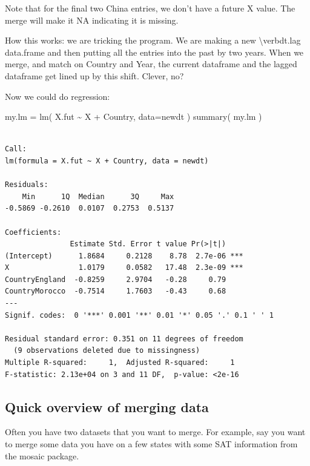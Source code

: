 \documentclass[
  letterpaper,
  DIV=11,
  numbers=noendperiod]{scrreprt}
\newenvironment{Shaded}{}{}
\newcommand{\AttributeTok}[1]{\textcolor[rgb]{0.49,0.56,0.16}{#1}}
\newcommand{\FunctionTok}[1]{\textcolor[rgb]{0.02,0.16,0.49}{#1}}
\newcommand{\NormalTok}[1]{#1}
\newcommand{\OtherTok}[1]{\textcolor[rgb]{0.00,0.44,0.13}{#1}}
\newcommand{\SpecialCharTok}[1]{\textcolor[rgb]{0.25,0.44,0.63}{#1}}
\begin{document}
Note that for the final two China entries, we don't have a future X
value. The merge will make it NA indicating it is missing.

How this works: we are tricking the program. We are making a new
\textbackslash verb\textbar dt.lag\textbar{} data.frame and then putting
all the entries into the past by two years. When we merge, and match on
Country and Year, the current dataframe and the lagged dataframe get
lined up by this shift. Clever, no?

Now we could do regression:

\begin{Shaded}
\begin{Highlighting}[]
\NormalTok{my.lm }\OtherTok{=} \FunctionTok{lm}\NormalTok{( X.fut }\SpecialCharTok{\textasciitilde{}}\NormalTok{ X }\SpecialCharTok{+}\NormalTok{ Country, }\AttributeTok{data=}\NormalTok{newdt )}
\FunctionTok{summary}\NormalTok{( my.lm )}
\end{Highlighting}
\end{Shaded}

\begin{verbatim}

Call:
lm(formula = X.fut ~ X + Country, data = newdt)

Residuals:
    Min      1Q  Median      3Q     Max 
-0.5869 -0.2610  0.0107  0.2753  0.5137 

Coefficients:
               Estimate Std. Error t value Pr(>|t|)    
(Intercept)      1.8684     0.2128    8.78  2.7e-06 ***
X                1.0179     0.0582   17.48  2.3e-09 ***
CountryEngland  -0.8259     2.9704   -0.28     0.79    
CountryMorocco  -0.7514     1.7603   -0.43     0.68    
---
Signif. codes:  0 '***' 0.001 '**' 0.01 '*' 0.05 '.' 0.1 ' ' 1

Residual standard error: 0.351 on 11 degrees of freedom
  (9 observations deleted due to missingness)
Multiple R-squared:     1,  Adjusted R-squared:     1 
F-statistic: 2.13e+04 on 3 and 11 DF,  p-value: <2e-16
\end{verbatim}

\subsection{Quick overview of merging
data}\label{quick-overview-of-merging-data}

Often you have two datasets that you want to merge. For example, say you
want to merge some data you have on a few states with some SAT
information from the mosaic package.
\end{document}
